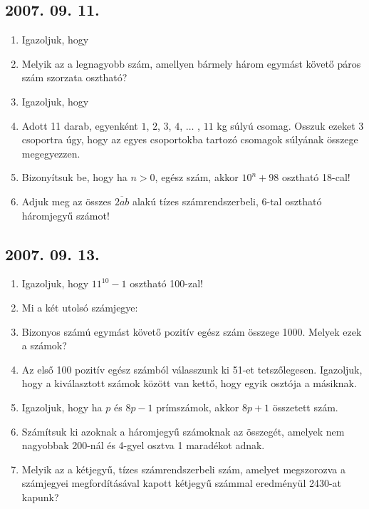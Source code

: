 \subsection*{2007. 09. 11.}
\begin{enumerate}
\item Igazoljuk, hogy
\item Melyik az a legnagyobb szám, amellyen bármely három egymást követő páros szám szorzata osztható?
\item Igazoljuk, hogy
\item Adott 11 darab, egyenként $1$, $2$, $3$, $4$, $\ldots$ , $11$ kg súlyú csomag. Osszuk ezeket 3 csoportra úgy, hogy az egyes csoportokba tartozó csomagok súlyának összege megegyezzen.
\item Bizonyítsuk be, hogy ha $n > 0$, egész szám, akkor $10^n+98$ osztható 18-cal!
\item Adjuk meg az összes $\overline{2ab}$ alakú tízes számrendszerbeli, 6-tal osztható háromjegyű számot!
\end{enumerate}


\subsection*{2007. 09. 13.}
\begin{enumerate}
\item Igazoljuk, hogy $11^{10}-1$ osztható 100-zal!
\item Mi a két utolsó számjegye:
\item Bizonyos számú egymást követő pozitív egész szám összege 1000. Melyek ezek a számok?
\item Az első 100 pozitív egész számból válasszunk ki 51-et tetszőlegesen. Igazoljuk, hogy a kiválasztott számok között van kettő, hogy egyik osztója a másiknak.
\item Igazoljuk, hogy ha $p$ és $8p-1$ prímszámok, akkor $8p+1$ összetett szám.
\item Számítsuk ki azoknak a háromjegyű számoknak az összegét, amelyek nem nagyobbak 200-nál és 4-gyel osztva 1 maradékot adnak.
\item Melyik az a kétjegyű, tízes számrendszerbeli szám, amelyet megszorozva a számjegyei megfordításával kapott kétjegyű számmal eredményül 2430-at kapunk?
\end{enumerate}


